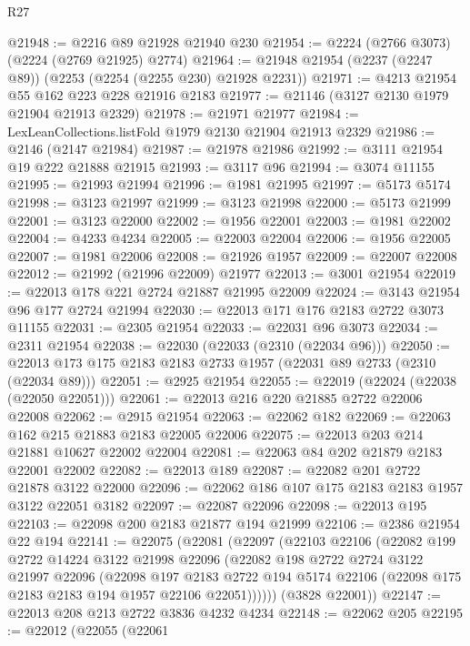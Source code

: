 \begin{lexlean}{R27}
\begin{coremodule}
@21948 := @2216 @89 @21928 @21940 @230
@21954 := @2224 (@2766 @3073) (@2224 (@2769 @21925) @2774)
@21964 := @21948 @21954 (@2237 (@2247 @89)) (@2253 (@2254 (@2255 @230) @21928 @2231))
@21971 := @4213 @21954 @55 @162 @223 @228 @21916 @2183
@21977 := @21146 (@3127 @2130 @1979 @21904 @21913 @2329)
@21978 := @21971 @21977
@21984 := LexLeanCollections.listFold @1979 @2130 @21904 @21913 @2329
@21986 := @2146 (@2147 @21984)
@21987 := @21978 @21986
@21992 := @3111 @21954 @19 @222 @21888 @21915
@21993 := @3117 @96
@21994 := @3074 @11155
@21995 := @21993 @21994
@21996 := @1981 @21995
@21997 := @5173 @5174
@21998 := @3123 @21997
@21999 := @3123 @21998
@22000 := @5173 @21999
@22001 := @3123 @22000
@22002 := @1956 @22001
@22003 := @1981 @22002
@22004 := @4233 @4234
@22005 := @22003 @22004
@22006 := @1956 @22005
@22007 := @1981 @22006
@22008 := @21926 @1957
@22009 := @22007 @22008
@22012 := @21992 (@21996 @22009) @21977
@22013 := @3001 @21954
@22019 := @22013 @178 @221 @2724 @21887 @21995 @22009
@22024 := @3143 @21954 @96 @177 @2724 @21994
@22030 := @22013 @171 @176 @2183 @2722 @3073 @11155
@22031 := @2305 @21954
@22033 := @22031 @96 @3073
@22034 := @2311 @21954
@22038 := @22030 (@22033 (@2310 (@22034 @96)))
@22050 := @22013 @173 @175 @2183 @2183 @2733 @1957 (@22031 @89 @2733 (@2310 (@22034 @89)))
@22051 := @2925 @21954
@22055 := @22019 (@22024 (@22038 (@22050 @22051)))
@22061 := @22013 @216 @220 @21885 @2722 @22006 @22008
@22062 := @2915 @21954
@22063 := @22062 @182
@22069 := @22063 @162 @215 @21883 @2183 @22005 @22006
@22075 := @22013 @203 @214 @21881 @10627 @22002 @22004
@22081 := @22063 @84 @202 @21879 @2183 @22001 @22002
@22082 := @22013 @189
@22087 := @22082 @201 @2722 @21878 @3122 @22000
@22096 := @22062 @186 @107 @175 @2183 @2183 @1957 @3122 @22051 @3182
@22097 := @22087 @22096
@22098 := @22013 @195
@22103 := @22098 @200 @2183 @21877 @194 @21999
@22106 := @2386 @21954 @22 @194
@22141 := @22075
    (@22081
      (@22097
        (@22103
          @22106
          (@22082
            @199
            @2722
            @14224
            @3122
            @21998
            @22096
            (@22082
              @198
              @2722
              @2724
              @3122
              @21997
              @22096
              (@22098
                @197
                @2183
                @2722
                @194
                @5174
                @22106
                (@22098 @175 @2183 @2183 @194 @1957 @22106 @22051))))))
      (@3828 @22001))
@22147 := @22013 @208 @213 @2722 @3836 @4232 @4234
@22148 := @22062 @205
@22195 := @22012
    (@22055
      (@22061

\end{coremodule}
\end{lexlean}
